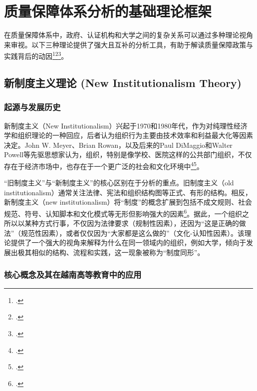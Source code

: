 

\section{质量保障体系分析的基础理论框架}
\label{sec:khung_ly_thuyet_nen_tang}

在质量保障体系中，政府、认证机构和大学之间的复杂关系可以通过多种理论视角来审视。以下三种理论提供了强大且互补的分析工具，有助于解读质量保障政策与实践背后的动因\footcite{OxfordResearch}\footcite{GovernanceTheories}\footcite{SAGE_HE}。

\subsection{新制度主义理论 (New Institutionalism Theory)}
\label{subsec:tan_the_che_nen_teng}

\subsubsection{起源与发展历史}
新制度主义（New Institutionalism）兴起于1970和1980年代，作为对纯理性经济学和组织理论的一种回应，后者认为组织行为主要由技术效率和利益最大化等因素决定。John W. Meyer、Brian Rowan，以及后来的Paul DiMaggio和Walter Powell等先驱思想家认为，组织，特别是像学校、医院这样的公共部门组织，不仅存在于经济市场中，也存在于一个更广泛的社会和文化环境中\footcite{MeyerRowan1977}\footcite{DiMaggioPowell1983}。

“旧制度主义”与“新制度主义”的核心区别在于分析的重点。旧制度主义（old institutionalism）通常关注法律、宪法和组织结构图等正式、有形的结构。相反，新制度主义（new institutionalism）将“制度”的概念扩展到包括不成文规则、社会规范、符号、认知脚本和文化模式等无形但影响强大的因素\footcite{MeyerPowell2020}。据此，一个组织之所以以某种方式行事，不仅因为法律要求（规制性因素），还因为“这是正确的做法”（规范性因素），或者仅仅因为“大家都是这么做的”（文化-认知性因素）。该理论提供了一个强大的视角来解释为什么在同一领域内的组织，例如大学，倾向于发展出极其相似的结构、流程和实践，这一现象被称为“制度同形”。

\subsubsection{核心概念及其在越南高等教育中的应用}

